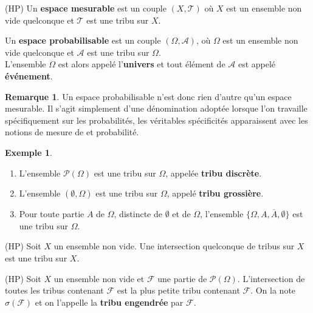 \documentclass[french]{article}
\theoremstyle{plain}
\theoremstyle{definition}
\newtheorem*{ex}{Exemple}
\newtheorem*{rmq}{Remarque}
\theoremstyle{remark}
\begin{document}
\begin{dfn}{(HP)}
	Un \textbf{espace mesurable} est un couple $(X,\mathcal{T})$ où $X$ est un ensemble non vide quelconque et $\mathcal{T}$ est une tribu sur $X$.
\end{dfn}

\begin{dfn}
	Un \textbf{espace probabilisable} est un couple $(\Omega,\mathcal{A})$, où $\Omega$ est un ensemble non vide quelconque et $\mathcal{A}$ est une tribu sur $\Omega$.\\
	L'ensemble $\Omega$ est alors appelé l'\textbf{univers} et tout élément de $\mathcal{A}$ est appelé \textbf{événement}.
\end{dfn}

\begin{rmq}
	Un espace probabilisable n'est donc rien d'autre qu'un espace mesurable. Il s'agit simplement d'une dénomination adoptée lorsque l'on travaille spécifiquement sur les probabilités, les véritables spécificités apparaissent avec les notions de mesure de et probabilité.
\end{rmq}

\begin{ex}
	\begin{enumerate}
		\item L'ensemble $\mathcal{P}(\Omega)$ est une tribu sur $\Omega$, appelée \textbf{tribu discrète}.
		\item L'ensemble $(\emptyset,\Omega)$ est une tribu sur $\Omega$, appelé \textbf{tribu grossière}.
		\item Pour toute partie $A$ de $\Omega$, distincte de $\emptyset$ et de $\Omega$, l'ensemble $\{\Omega,A,\overline{A},\emptyset\}$ est une tribu sur $\Omega$.
	\end{enumerate}
\end{ex}

\begin{thm}{(HP)}%
	Soit $X$ un ensemble non vide. Une intersection quelconque de tribus sur $X$ est une tribu sur $X$.
\end{thm}

\begin{dfn}{(HP)}
	Soit $X$ un ensemble non vide et $\mathcal{F}$ une partie de $\mathcal{P}(\Omega)$. L'intersection de toutes les tribus contenant $\mathcal{F}$ est la plus petite tribu contenant $\mathcal{F}$. On la note $\sigma(\mathcal{F})$ et on l'appelle la \textbf{tribu engendrée} par $\mathcal{F}$.
\end{dfn}
\end{document}

